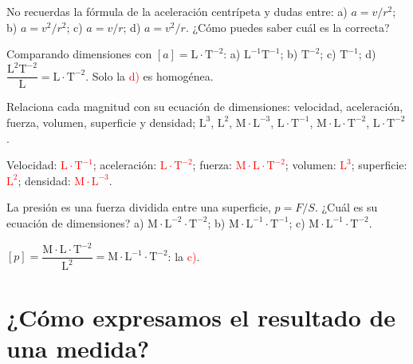 \begin{exercise}
    No recuerdas la fórmula de la aceleración centrípeta y dudas entre: a) \(a = v/r^2\); b) \(a = v^2/r^2\); c) \(a = v/r\); d) \(a = v^2/r\). ¿Cómo puedes saber cuál es la correcta?
    \begin{solu}
        Comparando dimensiones con \([a] = \mathrm{L \cdot T^{-2}}\): a) \(\mathrm{L^{-1} T^{-1}}\); b) \(\mathrm{T^{-2}}\); c) \(\mathrm{T^{-1}}\); d) \(\dfrac{\mathrm{L^2 T^{-2}}}{\mathrm{L}} = \mathrm{L \cdot T^{-2}}\). Solo la \textcolor{red}{d)} es homogénea.
    \end{solu}
\end{exercise}

\begin{exercise}
    Relaciona cada magnitud con su ecuación de dimensiones: velocidad, aceleración, fuerza, volumen, superficie y densidad; \(\mathrm{L^3}\), \(\mathrm{L^2}\), \(\mathrm{M \cdot L^{-3}}\), \(\mathrm{L \cdot T^{-1}}\), \(\mathrm{M \cdot L \cdot T^{-2}}\), \(\mathrm{L \cdot T^{-2}}\).
    \begin{solu}
        Velocidad: \textcolor{red}{\(\mathrm{L \cdot T^{-1}}\)}; aceleración: \textcolor{red}{\(\mathrm{L \cdot T^{-2}}\)}; fuerza: \textcolor{red}{\(\mathrm{M \cdot L \cdot T^{-2}}\)}; volumen: \textcolor{red}{\(\mathrm{L^3}\)}; superficie: \textcolor{red}{\(\mathrm{L^2}\)}; densidad: \textcolor{red}{\(\mathrm{M \cdot L^{-3}}\)}.
    \end{solu}
\end{exercise}

\begin{exercise}
    La presión es una fuerza dividida entre una superficie, \(p = F/S\). ¿Cuál es su ecuación de dimensiones? a) \(\mathrm{M \cdot L^{-2} \cdot T^{-2}}\); b) \(\mathrm{M \cdot L^{-1} \cdot T^{-1}}\); c) \(\mathrm{M \cdot L^{-1} \cdot T^{-2}}\).
    \begin{solu}
        \([p] = \dfrac{\mathrm{M \cdot L \cdot T^{-2}}}{\mathrm{L^2}} = \mathrm{M \cdot L^{-1} \cdot T^{-2}}\): la \textcolor{red}{c)}.
    \end{solu}
\end{exercise}

\section[El resultado de una medida]{¿Cómo expresamos el resultado de una medida?}

